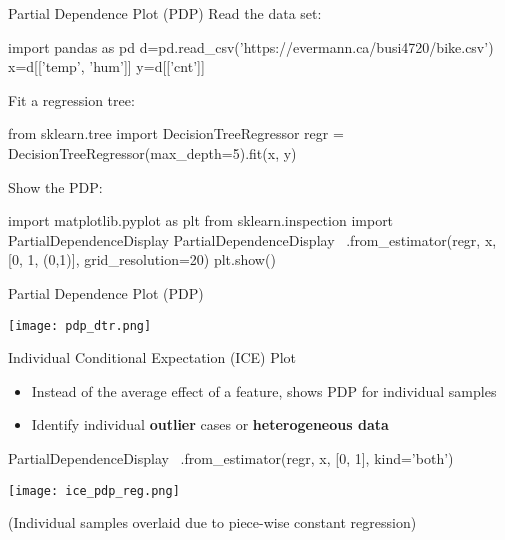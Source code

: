 \documentclass[ignorenonframetext,xcolor=x11names]{beamer}
\begin{document}




\begin{frame}[fragile]{Partial Dependence Plot (PDP)}
Read the data set:
\begin{pythoncode}
import pandas as pd
d=pd.read_csv('https://evermann.ca/busi4720/bike.csv')
x=d[['temp', 'hum']]
y=d[['cnt']]
\end{pythoncode}
Fit a regression tree:
\begin{pythoncode}
from sklearn.tree import DecisionTreeRegressor
regr = DecisionTreeRegressor(max_depth=5).fit(x, y)
\end{pythoncode}
Show the PDP:
\begin{pythoncode}
import matplotlib.pyplot as plt
from sklearn.inspection import PartialDependenceDisplay
PartialDependenceDisplay \
    .from_estimator(regr, x, [0, 1, (0,1)],
        grid_resolution=20)
plt.show()
\end{pythoncode}
\end{frame}

\begin{frame}{Partial Dependence Plot (PDP)}
\begin{center}
\texttt{[image: pdp\_dtr.png]}
\end{center}
\end{frame}

\begin{frame}[fragile]{Individual Conditional Expectation (ICE) Plot}
\begin{itemize}
\item Instead of the average effect of a feature, shows PDP for individual samples
\item Identify individual \textbf{outlier} cases or \textbf{heterogeneous data}
\end{itemize} 
\begin{pythoncode}
PartialDependenceDisplay \
    .from_estimator(regr, x, [0, 1], kind='both')
\end{pythoncode}
\begin{center}
\texttt{[image: ice\_pdp\_reg.png]}
\end{center}

\footnotesize (Individual samples overlaid due to piece-wise constant regression)
\end{frame}
\end{document}
